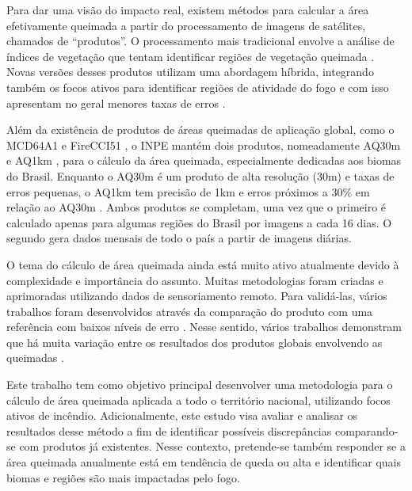 \documentclass[cic,tc]{iiufrgs}
\begin{document}

Para dar uma visão do impacto real, existem métodos para calcular a área efetivamente queimada a partir do processamento de imagens de satélites, chamados de ``produtos''. O processamento mais tradicional envolve a análise de índices de vegetação que tentam identificar regiões de vegetação queimada \citep{pereira1999}. Novas versões desses produtos utilizam uma abordagem híbrida, integrando também os focos ativos para identificar regiões de atividade do fogo e com isso apresentam no geral menores taxas de erros \citep{BOSCHETTI2019111490}.

Além da existência de produtos de áreas queimadas de aplicação global, como o MCD64A1 \citep{GIGLIO201872} e FireCCI51 \citep{Lizundia2020}, o INPE mantém dois produtos, nomeadamente AQ30m \citep{melchiori2014landsat} e AQ1km \citep{libonati2015algorithm}, para o cálculo da área queimada, especialmente dedicadas aos biomas do Brasil. Enquanto o AQ30m é um produto de alta resolução (30m) e taxas de erros pequenas, o AQ1km tem precisão de 1km e erros próximos a 30\% em relação ao AQ30m \cite{PerguntasFrequentesINPE}. Ambos produtos se completam, uma vez que o primeiro é calculado apenas para algumas regiões do Brasil por imagens a cada 16 dias. O segundo gera dados mensais de todo o país a partir de imagens diárias.  

O tema do cálculo de área queimada ainda está muito ativo atualmente devido à complexidade e importância do assunto. Muitas metodologias foram criadas e aprimoradas utilizando dados de sensoriamento remoto. Para validá-las, vários 
trabalhos foram desenvolvidos através da comparação do produto com uma referência com baixos níveis de erro \citep{BOSCHETTI2016465, BOSCHETTI2019111490}. Nesse sentido, vários trabalhos demonstram que há muita variação entre os resultados dos produtos globais envolvendo as queimadas \citep{Boschetti2004, Humber2019}. 

Este trabalho tem como objetivo principal desenvolver uma metodologia para o cálculo de área queimada aplicada a todo o território nacional, utilizando focos ativos de incêndio. Adicionalmente, este estudo visa avaliar e analisar os resultados desse método a fim de identificar possíveis discrepâncias comparando-se com produtos já existentes. Nesse contexto, pretende-se também responder se a área queimada anualmente está em tendência de queda ou alta e identificar quais biomas e regiões são mais impactadas pelo fogo.
\end{document}
